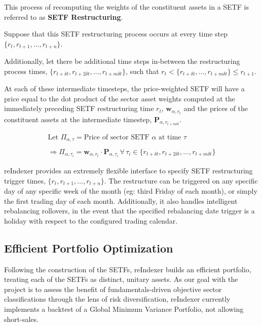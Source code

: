 \documentclass[../main.tex]{subfiles}
\begin{document}
This process of recomputing the weights of the constituent assets in a SETF is referred to as \textbf{SETF Restructuring}.

Suppose that this SETF restructuring process occurs at every time step $\{ r_t, r_{t+1}, \ldots, r_{t+n} \}$.

Additionally, let there be additional time steps in-between the restructuring process times, $\{ r_{t + \delta t}, r_{t + 2\delta t}, \ldots, r_{t + m \delta t} \}$, such that {${r_t < \{ r_{t + \delta t}, \ldots, r_{t + m\delta t} \} \leq r_{t + 1}}$}.

At each of these intermediate timesteps, the price-weighted SETF will have a price equal to the dot product of the sector asset weights computed at the immediately preceding SETF restructuring time $r_{t}$, $\boldsymbol{w}_{\alpha,r_t}$ and the prices of the constituent assets at the intermediate timestep, $\boldsymbol{P}_{\alpha,r_{t+m\delta t}}$.

\begin{gather*}
    \text{Let $\Pi_{\alpha,\tau}$} = \text{Price of sector SETF $\alpha$ at time $\tau$} \\
    \\
    \Rightarrow \Pi_{\alpha,\tau_i} = \boldsymbol{w}_{\alpha, r_t} \cdot \boldsymbol{P}_{\alpha,\tau_i} \, \forall \, \tau_i \in \{ r_{t + \delta t}, r_{t + 2\delta t}, \ldots, r_{t + m \delta t} \}
\end{gather*}

reIndexer provides an extremely flexible interface to specify SETF restructuring trigger times, $\{ r_t, r_{t+1}, \ldots, r_{t+n} \}$. The restructure can be triggered on any specific day of any specific week of the month (eg: third Friday of each month), or simply the first trading day of each month. Additionally, it also handles intelligent rebalancing rollovers, in the event that the specified rebalancing date trigger is a holiday with respect to the configured trading calendar.


\subsection{Efficient Portfolio Optimization}

Following the construction of the SETFs, reIndexer builds an efficient portfolio, treating each of the SETFs as distinct, unitary assets. As our goal with the project is to assess the benefit of fundamentals-driven objective sector classifications through the lens of risk diversification, reIndexer currently implements a backtest of a Global Minimum Variance Portfolio, not allowing short-sales.
\end{document}
